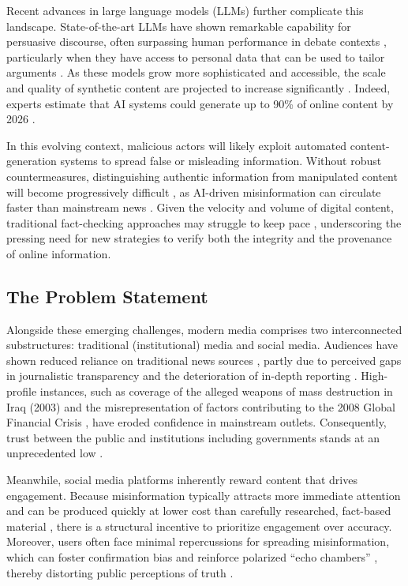 \documentclass{article}
\begin{document}
Recent advances in large language models (LLMs) further complicate this landscape. State-of-the-art LLMs have shown remarkable capability for persuasive discourse, often surpassing human performance in debate contexts \cite{rescala2024}, particularly when they have access to personal data that can be used to tailor arguments \cite{salvi2025}. As these models grow more sophisticated and accessible, the scale and quality of \gls{synthetic content} are projected to increase significantly \cite{ai-growth:2018, merging-with-machine:2010}. Indeed, experts estimate that AI systems could generate up to 90\% of online content by 2026 \cite{deepfakes}.

In this evolving context, malicious actors will likely exploit automated content-generation systems to spread false or misleading information. Without robust countermeasures, distinguishing authentic information from manipulated content will become progressively difficult \cite{adapting-to-llms:2023, societal-impact-of-llms:2021}, as AI-driven misinformation can circulate faster than mainstream news \cite{shao:2017}. Given the velocity and volume of digital content, traditional fact-checking approaches may struggle to keep pace \cite{pace-of-fake-news:2017}, underscoring the pressing need for new strategies to verify both the integrity and the provenance of online information.

\subsection{The Problem Statement}

Alongside these emerging challenges, modern media comprises two interconnected substructures: traditional (institutional) media and social media. Audiences have shown reduced reliance on traditional news sources \cite{whototrust}, partly due to perceived gaps in journalistic transparency and the deterioration of in-depth reporting \cite{trust-decline-journalism:2019}. High-profile instances, such as coverage of the alleged weapons of mass destruction in Iraq (2003) \cite{wmds} and the misrepresentation of factors contributing to the 2008 Global Financial Crisis \cite{the-big-short}, have eroded confidence in mainstream outlets. Consequently, trust between the public and institutions including governments stands at an unprecedented low \cite{trust-decline-institution:2017, edelman-trust-report:2023}.

Meanwhile, social media platforms inherently reward content that drives engagement. Because misinformation typically attracts more immediate attention and can be produced quickly at lower cost than carefully researched, fact-based material \cite{mitSpread2018}, there is a structural incentive to prioritize engagement over accuracy. Moreover, users often face minimal repercussions for spreading misinformation, which can foster confirmation bias and reinforce polarized ``echo chambers'' \cite{sunstein:echo-chambers, pariser:echo-chambers}, thereby distorting public perceptions of truth \cite{social-media-echo-chamber}.
\end{document}
